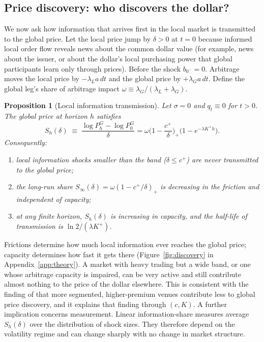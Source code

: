\documentclass[12pt]{article}
\newtheorem{proposition}{Proposition}
\theoremstyle{definition}
\theoremstyle{remark}
\begin{document}
\subsection{Price discovery: who discovers the dollar?}

We now ask how information that arrives first in the local market is transmitted to the global price. Let the local price jump by $\delta>0$ at $t=0$ because informed local order flow reveals news about the common dollar value (for example, news about the issuer, or about the dollar's local purchasing power that global participants learn only through prices). Before the shock $b_{0^-}=0$. Arbitrage moves the local price by $-\lambda_L a\,dt$ and the global price by $+\lambda_G a\,dt$. Define the global leg's share of arbitrage impact $\omega\equiv\lambda_G/(\lambda_L+\lambda_G)$.

\begin{proposition}[Local information transmission]\label{prop:discovery}
Let $\sigma=0$ and $q_t\equiv0$ for $t>0$. The global price at horizon $h$ satisfies
\[
S_h(\delta)\;\equiv\;\frac{\log P^G_h-\log P^G_0}{\delta} = \omega\Big(1-\frac{c^+}{\delta}\Big)_+\big(1-e^{-\lambda K^+ h}\big).
\]
Consequently:
\begin{enumerate}[label=(\alph*)]
\item local information shocks smaller than the band ($\delta\le c^+$) are never transmitted to the global price;
\item the long-run share $S_\infty(\delta)=\omega(1-c^+/\delta)_+$ is decreasing in the friction and independent of capacity;
\item at any finite horizon, $S_h(\delta)$ is increasing in capacity, and the half-life of transmission is $\ln2/(\lambda K^+)$.
\end{enumerate}
\end{proposition}

Frictions determine how much local information ever reaches the global price; capacity determines how fast it gets there (Figure~\ref{fig:discovery} in Appendix~\ref{app:theory}). A market with heavy trading but a wide band, or one whose arbitrage capacity is impaired, can be very active and still contribute almost nothing to the price of the dollar elsewhere. This is consistent with the finding of \citet{makarov2020trading} that more segmented, higher-premium venues contribute less to global price discovery, and it explains that finding through $(c,K)$. A further implication concerns measurement. Linear information-share measures \citep{hasbrouck1995one, gonzalo1995estimation} average $S_h(\delta)$ over the distribution of shock sizes. They therefore depend on the volatility regime and can change sharply with no change in market structure.
\end{document}
